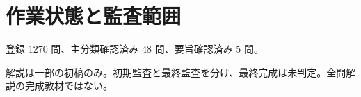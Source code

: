 \chapter{作業状態と監査範囲}
登録 1270 問、主分類確認済み 48 問、要旨確認済み 5 問。
\par 解説は一部の初稿のみ。初期監査と最終監査を分け、最終完成は未判定。全問解説の完成教材ではない。
